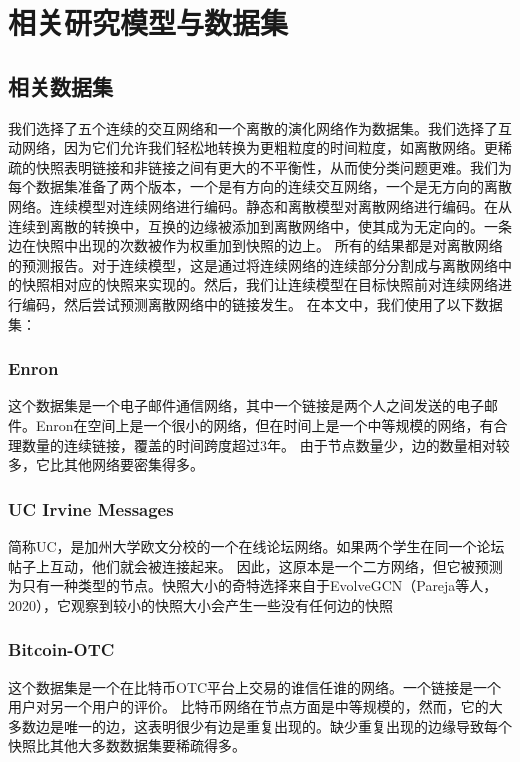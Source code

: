 \documentclass[conference]{IEEEtran}
\begin{document}
\section{相关研究模型与数据集}

\subsection{相关数据集}
我们选择了五个连续的交互网络和一个离散的演化网络作为数据集。我们选择了互动网络，因为它们允许我们轻松地转换为更粗粒度的时间粒度，如离散网络。更稀疏的快照表明链接和非链接之间有更大的不平衡性，从而使分类问题更难。我们为每个数据集准备了两个版本，一个是有方向的连续交互网络，一个是无方向的离散网络。连续模型对连续网络进行编码。静态和离散模型对离散网络进行编码。在从连续到离散的转换中，互换的边缘被添加到离散网络中，使其成为无定向的。一条边在快照中出现的次数被作为权重加到快照的边上。
所有的结果都是对离散网络的预测报告。对于连续模型，这是通过将连续网络的连续部分分割成与离散网络中的快照相对应的快照来实现的。然后，我们让连续模型在目标快照前对连续网络进行编码，然后尝试预测离散网络中的链接发生。
在本文中，我们使用了以下数据集：

\subsubsection{Enron}
这个数据集是一个电子邮件通信网络，其中一个链接是两个人之间发送的电子邮件。Enron在空间上是一个很小的网络，但在时间上是一个中等规模的网络，有合理数量的连续链接，覆盖的时间跨度超过3年。
由于节点数量少，边的数量相对较多，它比其他网络要密集得多。

\subsubsection{UC Irvine Messages}
简称UC，是加州大学欧文分校的一个在线论坛网络。如果两个学生在同一个论坛帖子上互动，他们就会被连接起来。
因此，这原本是一个二方网络，但它被预测为只有一种类型的节点。快照大小的奇特选择来自于EvolveGCN（Pareja等人，2020），它观察到较小的快照大小会产生一些没有任何边的快照

\subsubsection{Bitcoin-OTC}
这个数据集是一个在比特币OTC平台上交易的谁信任谁的网络。一个链接是一个用户对另一个用户的评价。
比特币网络在节点方面是中等规模的，然而，它的大多数边是唯一的边，这表明很少有边是重复出现的。缺少重复出现的边缘导致每个快照比其他大多数数据集要稀疏得多。
\end{document}
